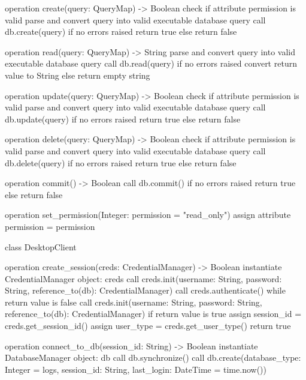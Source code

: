 \documentclass[a4paper, 11pt]{article}
\begin{document}
\begin{appendices}
\begin{pseudocode}[caption={CredentialManager Entity Class}, label={db}]
{  operation create(query: QueryMap) -> Boolean {
    check if attribute permission is valid {
      parse and convert query into valid executable database query
      call db.create(query)
      if no errors raised {
        return true
      } else {
        return false
      }
    }
  }

  operation read(query: QueryMap) -> String {
    parse and convert query into valid executable database query
    call db.read(query)
    if no errors raised {
      convert return value to String
    } else {
      return empty string
    }
  }

  operation update(query: QueryMap) -> Boolean {
    check if attribute permission is valid {
      parse and convert query into valid executable database query
      call db.update(query)
      if no errors raised {
        return true
      } else {
        return false
      }
    }
  }

  operation delete(query: QueryMap) -> Boolean {
    check if attribute permission is valid {
      parse and convert query into valid executable database query
      call db.delete(query)
      if no errors raised {
        return true
      } else {
        return false
      }
    }
  }

  operation commit() -> Boolean {  
    call db.commit()
    if no errors raised {
      return true
    } else {
      return false
    }
  }

  operation set_permission(Integer: permission = "read_only"){
    assign attribute permission = permission
  }

}
\end{pseudocode}

\begin{pseudocode}[caption={DesktopClient Entity Class}, label={desktop}]
class DesktopClient {

  operation create_session(creds: CredentialManager) -> Boolean {
    instantiate CredentialManager object: creds
    call creds.init(username: String, password: String, reference_to(db): CredentialManager)
    call creds.authenticate()
    while return value is false {
      call creds.init(username: String, password: String, reference_to(db): CredentialManager)
      if return value is true {
        assign session_id = creds.get_session_id()
        assign user_type = creds.get_user_type()
        return true
      }
    }
  }

  operation connect_to_db(session_id: String) -> Boolean {
    instantiate DatabaseManager object: db
    call db.synchronize()
    call db.create(database_type: Integer = logs, session_id: String, last_login: DateTime = time.now())
  }

}
\end{pseudocode}
\end{appendices}
\end{document}
